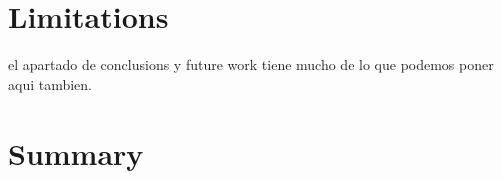 \section{Limitations}\label{sec:spacerl-limitations}
el apartado de conclusions y future work tiene mucho de lo que podemos poner aqui tambien.



\section{Summary}\label{sec:cafe-summary}

